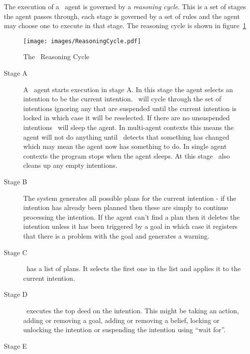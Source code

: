 The execution of a \gwendolen\ agent is governed by a \emph{reasoning cycle}.  This is a set of stages the agent passes through, each stage is governed by a set of rules and the agent may choose one to execute in that stage.  The reasoning cycle is shown in figure~\ref{fig:reasoning_cycle}
\begin{figure}
\texttt{[image: images/ReasoningCycle.pdf]}
\caption{The \gwendolen\ Reasoning Cycle}
\label{fig:reasoning_cycle}
\end{figure}
\begin{description}
\item[Stage A]
A \gwendolen\ agent starts execution in stage A.  In this stage the agent selects an intention to be the current intention.  \gwendolen\ will cycle through the set of intentions ignoring any that are suspended until the current intention is locked in which case it will be reselected.  If there are no unsuspended intentions \gwendolen\ will sleep the agent.  In multi-agent contexts this means the agent will not do anything until \gwendolen\ detects that something has changed which may mean the agent now has something to do.  In single agent contexts the program stops when the agent sleeps.  At this stage \gwendolen\ also cleans up any empty intentions.
\item[Stage B]
The system generates all possible plans for the current intention - if the intention has already been planned then these are simply to continue processing the intention.  If the agent can't find a plan then it deletes the intention unless it has been triggered by a goal in which case it registers that there is a problem with the goal and generates a warning.
\item[Stage C]
\gwendolen\ has a list of plans.  It selects the first one in the list and applies it to the current intention.
\item[Stage D]
\gwendolen\ executes the top deed on the intention.  This might be taking an action, adding or removing a goal, adding or removing a belief, locking or unlocking the intention or suspending the intention using ``wait for''.
\item[Stage E]

\end{description}

